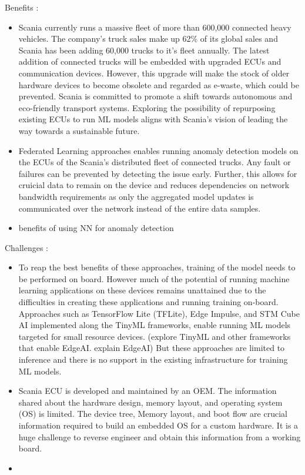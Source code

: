 Benefits :
\begin{itemize}
	\item Scania currently runs a massive fleet of more than 600,000 connected heavy vehicles. The company's truck sales make up 62\% of its global sales and Scania has been adding 60,000 trucks to it's fleet annually. The latest addition of connected trucks will be embedded with upgraded ECUs and communication devices. However, this upgrade will make the stock of older hardware devices to become obsolete and regarded as e-waste, which could be prevented. Scania is committed to promote a shift towards autonomous and eco-friendly transport systems. Exploring the possibility of repurposing existing ECUs to run ML models aligns with Scania's vision of leading the way towards a sustainable future. 
	\item Federated Learning approaches enables running anomaly detection models on the ECUs of the Scania's distributed fleet of connected trucks. Any fault or failures can be prevented by detecting the issue early. Further, this allows for cruicial data to remain on the device and reduces dependencies on network bandwidth requirements as only the aggregated model updates is communicated over the network instead of the entire data samples. 
	\item benefits of using NN for anomaly detection
\end{itemize}

Challenges :
\begin{itemize}
	\item To reap the best benefits of these approaches, training of the model needs to be performed on board. However much of the potential of running machine learning applications on these devices remains unattained due to the difficulties in creating these applications and running training on-board. Approaches such as TensorFlow Lite (TFLite), Edge Impulse, and STM Cube AI implemented along the TinyML frameworks, enable running ML models targeted for small resource devices. (explore TinyML and other frameworks that enable EdgeAI. explain EdgeAI)	But these approaches are limited to inference and there is no support in the existing infrastructure for training ML models.

	\item Scania ECU is developed and maintained by an OEM. The information shared about the hardware design, memory layout, and operating system (OS) is limited. The device tree, Memory layout, and boot flow are crucial information required to build an embedded OS for a custom hardware. It is a huge challenge to reverse engineer and obtain this information from a working board. 
	\item 
\end{itemize}

